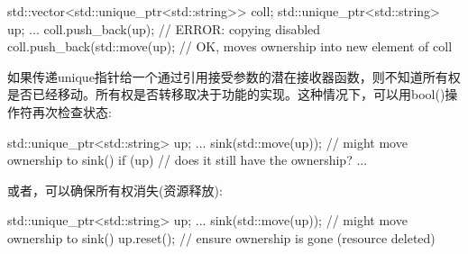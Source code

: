 \begin{cppcode}
std::vector<std::unique_ptr<std::string>> coll;
std::unique_ptr<std::string> up;
...
coll.push_back(up); // ERROR: copying disabled
coll.push_back(std::move(up); // OK, moves ownership into new element of coll
\end{cppcode}

如果传递unique指针给一个通过引用接受参数的潜在接收器函数，则不知道所有权是否已经移动。所有权是否转移取决于功能的实现。这种情况下，可以用bool()操作符再次检查状态:

\begin{cppcode}
std::unique_ptr<std::string> up;
...
sink(std::move(up)); // might move ownership to sink()
if (up) { // does it still have the ownership?
	...
}
\end{cppcode}

或者，可以确保所有权消失(资源释放):

\begin{cppcode}
std::unique_ptr<std::string> up;
...
sink(std::move(up)); // might move ownership to sink()
up.reset(); // ensure ownership is gone (resource deleted)
\end{cppcode}













